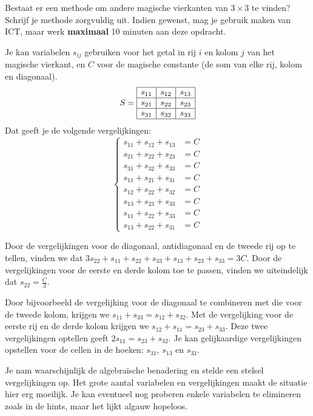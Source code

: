 \documentclass{ximera}
\begin{document}
\begin{exercise}
    Bestaat er een methode om andere magische vierkanten van \(3 \times 3\) te vinden?
    Schrijf je methode zorgvuldig uit.
    Indien gewenst, mag je gebruik maken van ICT, maar werk \textbf{maximaal} 10 minuten aan deze opdracht.
    \begin{hint}
        Je kan variabelen \(s_{ij}\) gebruiken voor het getal in rij \(i\) en kolom \(j\) van het magische vierkant, en \(C\) voor de magische constante (de som van elke rij, kolom en diagonaal).
        \[
        S=
        \begin{array}{|c|c|c|}
        \hline
        s_{11} & s_{12} & s_{13} \\
        \hline
        s_{21} & s_{22} &  s_{23}\\
        \hline
        s_{31} & s_{32} & s_{33} \\
        \hline
        \end{array}
        \]
        Dat geeft je de volgende vergelijkingen:
        \[
        \begin{cases}
        s_{11} + s_{12} + s_{13} &= C \\
        s_{21} + s_{22} + s_{23} &= C \\
        s_{31} + s_{32} + s_{33} &= C \\
        s_{11} + s_{21} + s_{31} &= C \\
        s_{12} + s_{22} + s_{32} &= C \\
        s_{13} + s_{23} + s_{33} &= C \\
        s_{11} + s_{22} + s_{33} &= C \\
        s_{13} + s_{22} + s_{31} &= C
        \end{cases}
        \]
    \end{hint}
    \begin{hint}
    Door de vergelijkingen voor de diagonaal, antidiagonaal en de tweede rij op te tellen, vinden we dat \(3s_{22}+s_{11}+s_{22}+s_{33}+s_{13}+s_{23}+s_{33}=3C\).
    Door de vergelijkingen voor de eerste en derde kolom toe te passen, vinden we uiteindelijk dat \(s_{22}=\frac{C}{3}\).
    \end{hint}
    \begin{hint}
        Door bijvoorbeeld de vergelijking voor de diagonaal te combineren met die voor de tweede kolom, krijgen we \(s_{11} + s_{33} = s_{12} + s_{32}\).
        Met de vergelijking voor de eerste rij en de derde kolom krijgen we \(s_{12} + s_{11} = s_{23} + s_{33}\).
        Deze twee vergelijkingen optellen geeft \(2s_{11} = s_{23} + s_{32}\).
        Je kan gelijkaardige vergelijkingen opstellen voor de cellen in de hoeken: \(s_{31}\), \(s_{13}\) en \(s_{33}\).
    \end{hint}
    \begin{oplossing}
        Je nam waarschijnlijk de algebraïsche benadering en stelde een stelsel vergelijkingen op.
        Het grote aantal variabelen en vergelijkingen maakt de situatie hier erg moeilijk.
        Je kan eventueel nog proberen enkele variabelen te elimineren zoals in de hints, maar het lijkt algauw hopeloos.\newline


\end{oplossing}
\end{exercise}
\end{document}
